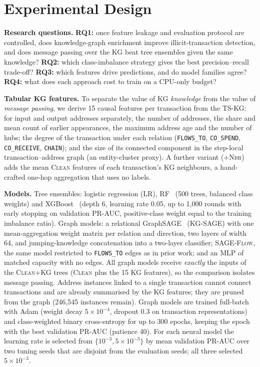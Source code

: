 \section{Experimental Design}\label{sec:method}

\textbf{Research questions.}
\textbf{RQ1:} once feature leakage and evaluation protocol are controlled, does
knowledge-graph enrichment improve illicit-transaction detection, and does
message passing over the KG beat tree ensembles given the same knowledge?
\textbf{RQ2:} which class-imbalance strategy gives the best precision--recall
trade-off? \textbf{RQ3:} which features drive predictions, and do model
families agree? \textbf{RQ4:} what does each approach cost to train on a
CPU-only budget?

\textbf{Tabular KG features.} To separate the value of KG \emph{knowledge}
from the value of \emph{message passing}, we derive 15 causal features per
transaction from the TS-KG: for input and output addresses separately, the
number of addresses, the share and mean count of earlier appearances, the
maximum address age and the number of hubs; the degree of the transaction
under each relation (\texttt{FLOWS\_TO}, \texttt{CO\_SPEND},
\texttt{CO\_RECEIVE}, \texttt{CHAIN}); and the size of its connected
component in the step-local transaction--address graph (an entity-cluster
proxy). A further variant (\textsc{+Nbr}) adds the mean \textsc{Clean}
features of each transaction's KG neighbours, a hand-crafted one-hop
aggregation that uses no labels.

\textbf{Models.} Tree ensembles: logistic regression (LR), RF~\cite{breiman2001}
(500 trees, balanced class weights) and XGBoost~\cite{chen2016} (depth 6,
learning rate 0.05, up to 1{,}000 rounds with early stopping on validation
PR-AUC, positive-class weight equal to the training imbalance ratio). Graph
models: a relational GraphSAGE~\cite{hamilton2017,schlichtkrull2018}
(\textsc{KG-SAGE}) with one mean-aggregation weight matrix per relation and
direction, two layers of width 64, and jumping-knowledge concatenation into a
two-layer classifier; \textsc{SAGE-Flow}, the same model restricted to
\texttt{FLOWS\_TO} edges as in prior work; and an \textsc{MLP} of matched
capacity with no edges. All graph models receive \emph{exactly} the inputs of
the \textsc{Clean+KG} trees (\textsc{Clean} plus the 15 KG features), so the
comparison isolates message passing. Address instances linked to a single
transaction cannot connect transactions and are already summarised by the KG
features; they are pruned from the graph (246{,}545 instances remain). Graph
models are trained full-batch with Adam (weight decay $5\times10^{-4}$,
dropout 0.3 on transaction representations) and class-weighted binary
cross-entropy for up to 300 epochs, keeping the epoch with the best
validation PR-AUC (patience 40). For each neural model the learning rate is
selected from $\{10^{-3}, 5\times10^{-3}\}$ by mean validation PR-AUC over
two tuning seeds that are disjoint from the evaluation seeds; all three
selected $5\times10^{-3}$.

